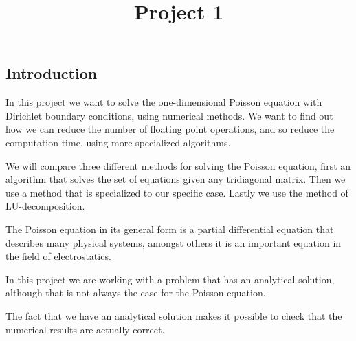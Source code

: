 \documentclass[12pt]{article}
\begin{document}
\title{Project 1}
\maketitle

\subsection{Introduction}

In this project we want to solve the one-dimensional Poisson equation with Dirichlet boundary conditions, using numerical methods. We want to find out how we can reduce the number of floating point operations, and so reduce the computation time, using more specialized  algorithms.  

We will compare three different methods for solving the Poisson equation, first an algorithm that solves the set of equations given any tridiagonal matrix. Then we use a method that is specialized to our specific case. Lastly we use the method of LU-decomposition. 

The Poisson equation in its general form is a  partial differential equation that describes many physical systems, amongst others it is an important equation in the field of electrostatics.

In this project we are working with a problem that has an analytical solution, although that is not always the case for the Poisson equation. 

The fact that we have an analytical solution makes it possible to check that the numerical results are actually correct. 
\end{document}

